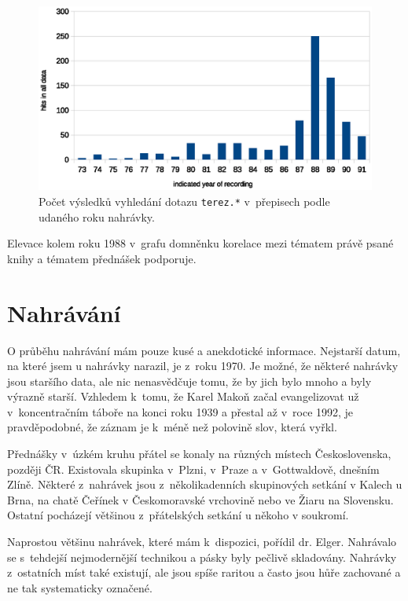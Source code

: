 \begin{figure}[htpb]
\includegraphics[scale=0.9]{rc/teresa-by-year.eps}
\caption{Počet výsledků vyhledání dotazu \texttt{terez.*} v~přepisech podle
udaného roku nahrávky.}
\label{fig:teresa-year}
\end{figure}

Elevace kolem roku 1988 v~grafu domněnku korelace mezi tématem právě psané knihy
a tématem přednášek podporuje.

\section{Nahrávání}
\label{sec:data:rec}

O průběhu nahrávání mám pouze kusé a anekdotické informace. Nejstarší datum, na
které jsem u nahrávky narazil, je z~roku 1970. Je možné, že některé nahrávky
jsou staršího data, ale nic nenasvědčuje tomu, že by jich bylo mnoho a byly
výrazně starší. Vzhledem k~tomu, že Karel Makoň začal evangelizovat už
v~koncentračním táboře na konci roku 1939 a přestal až v~roce 1992, je
pravděpodobné, že záznam je k~méně než polovině slov, která vyřkl.

Přednášky v~úzkém kruhu přátel se konaly na různých místech Československa,
později ČR.
Existovala skupinka v~Plzni, v~Praze a v~Gottwaldově, dnešním
Zlíně. Některé z~nahrávek jsou
z~několikadenních skupinových setkání v Kalech u Brna, na chatě Čeřínek v
Českomoravské vrchovině nebo ve Žiaru na Slovensku. Ostatní pocházejí většinou
z~přátelských setkání u někoho v soukromí.

Naprostou většinu nahrávek, které mám k~dispozici, pořídil dr. Elger.
Nahrávalo se s~tehdejší nejmodernější technikou a pásky byly pečlivě
skladovány. Nahrávky z~ostatních míst
také existují, ale jsou spíše raritou a často jsou hůře zachované a ne tak
systematicky označené.


